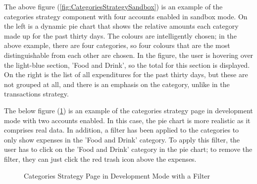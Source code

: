 The above figure (\ref{fig:CategoriesStrategySandbox}) is an example of the categories strategy component with four accounts enabled in sandbox mode. On the left is a dynamic pie chart that shows the relative amounts each category made up for the past thirty days. The colours are intelligently chosen; in the above example, there are four categories, so four colours that are the most distinguishable from each other are chosen. In the figure, the user is hovering over the light-blue section, 'Food and Drink', so the total for this section is displayed. On the right is the list of all expenditures for the past thirty days, but these are not grouped at all, and there is an emphasis on the category, unlike in the transactions strategy.

The below figure (\ref{fig:CategoriesStrategyDevelopment}) is an example of the categories strategy page in development mode with two accounts enabled. In this case, the pie chart is more realistic as it comprises real data. In addition, a filter has been applied to the categories to only show expenses in the 'Food and Drink' category. To apply this filter, the user has to click on the 'Food and Drink' category in the pie chart; to remove the filter, they can just click the red trash icon above the expenses.

\begin{figure}[H]
	\centering
	\caption{Categories Strategy Page in Development Mode with a Filter}
	\label{fig:CategoriesStrategyDevelopment}
\end{figure}


